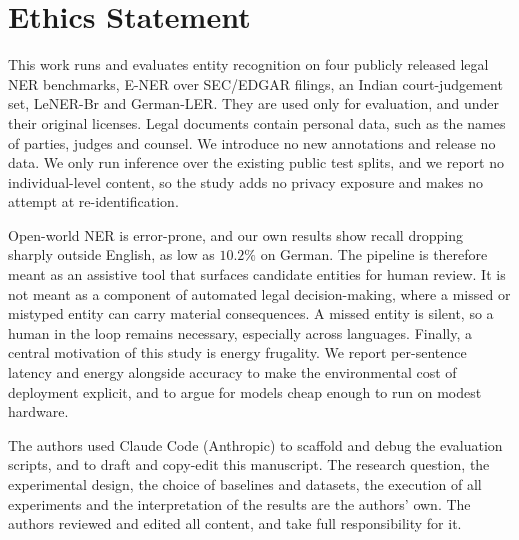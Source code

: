 \section*{Ethics Statement}
This work runs and evaluates entity recognition on four publicly released legal NER benchmarks, E-NER over SEC/EDGAR filings, an Indian court-judgement set, LeNER-Br and German-LER. They are used only for evaluation, and under their original licenses. Legal documents contain personal data, such as the names of parties, judges and counsel. We introduce no new annotations and release no data. We only run inference over the existing public test splits, and we report no individual-level content, so the study adds no privacy exposure and makes no attempt at re-identification.

Open-world NER is error-prone, and our own results show recall dropping sharply outside English, as low as $10.2\%$ on German. The pipeline is therefore meant as an assistive tool that surfaces candidate entities for human review. It is not meant as a component of automated legal decision-making, where a missed or mistyped entity can carry material consequences. A missed entity is silent, so a human in the loop remains necessary, especially across languages. Finally, a central motivation of this study is energy frugality. We report per-sentence latency and energy alongside accuracy to make the environmental cost of deployment explicit, and to argue for models cheap enough to run on modest hardware.

The authors used Claude Code (Anthropic) to scaffold and debug the evaluation scripts, and to draft and copy-edit this manuscript. The research question, the experimental design, the choice of baselines and datasets, the execution of all experiments and the interpretation of the results are the authors' own. The authors reviewed and edited all content, and take full responsibility for it.
